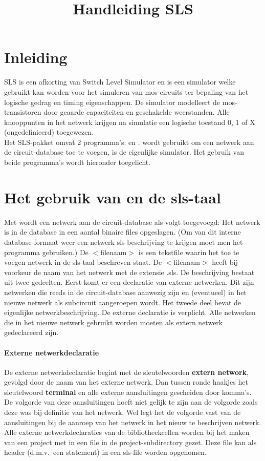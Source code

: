 \title{Handleiding SLS}
\maketitle
\label{mansls}
\section{Inleiding}

SLS is een afkorting van Switch Level Simulator en is een simulator welke 
gebruikt kan worden voor het simuleren van mos-circuits ter bepaling van
het logische gedrag en timing eigenschappen. De simulator modelleert de
mos-transistoren door geaarde capaciteiten en geschakelde weerstanden. Alle
knooppunten in het netwerk krijgen na simulatie een logische toestand 0, 1 of
X (ongedefinieerd) toegewezen.\\
Het SLS-pakket omvat 2 programma's:  en .  wordt
gebruikt om een netwerk aan de circuit-database toe te voegen,  is 
de eigenlijke simulator. Het gebruik van beide programma's wordt hieronder
toegelicht.
\section{Het gebruik van  en de sls-taal}
Met  wordt een netwerk aan de circuit-database als volgt toegevoegd:
Het netwerk is in de database in een aantal binaire files opgeslagen.
(Om van dit interne database-formaat weer een netwerk sls-beschrijving
te krijgen moet men het programma  gebruiken.)
De $<$filenaam$>$ is een tekstfile waarin het toe te voegen netwerk in de
sls-taal beschreven staat. De $<$filenaam$>$ heeft bij voorkeur de naam van
het netwerk met de extensie .sls. De beschrijving bestaat uit twee gedeelten. Eerst 
komt er een declaratie van externe netwerken. Dit zijn netwerken die reeds in
de circuit-database aanwezig zijn en (eventueel) in het nieuwe netwerk als
subcircuit aangeroepen wordt. Het tweede deel bevat de eigenlijke 
netwerkbeschrijving.
De externe declaratie is verplicht. Alle netwerken die in het nieuwe netwerk
gebruikt worden moeten als extern netwerk gedeclareerd zijn.
\paragraph{Externe netwerkdeclaratie} De externe netwerkdeclaratie begint met 
de sleutelwoorden {\bf extern network}, gevolgd door de naam van het externe 
netwerk. Dan tussen ronde haakjes het sleutelwoord {\bf terminal} en alle 
externe aansluitingen gescheiden door komma's. 
De volgorde van deze aansluitingen hoeft niet gelijk
te zijn aan de volgorde zoals deze was bij definitie van het netwerk. 
Wel legt het de volgorde vast van de aansluitingen bij de aanroep van het 
netwerk in het nieuw te beschrijven netwerk. Alle externe netwerkdeclaraties 
van de bibliotheekcellen worden bij het maken van een project 
met   in een file  in
de project-subdirectory  gezet.
Deze file kan als header (d.m.v.\ een  statement)
in een sls-file worden opgenomen.
